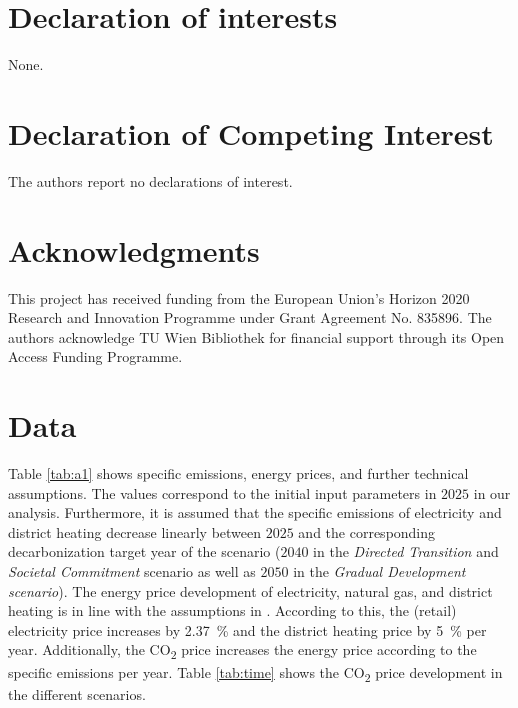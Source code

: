 \documentclass[review]{elsarticle}
\begin{document}






\section*{Declaration of interests}
None.
\section*{Declaration of Competing Interest}
The authors report no declarations of interest.
\section*{Acknowledgments}
This project has received funding from the European Union's Horizon 2020 Research and Innovation Programme under Grant Agreement No. 835896. The authors acknowledge TU Wien Bibliothek for financial support through its Open Access Funding Programme.


\appendix
\setcounter{table}{0}
\setcounter{figure}{0}
\newpage
\section{Data}\label{app:data}
Table \ref{tab:a1} shows specific emissions, energy prices, and further technical assumptions. The values correspond to the initial input parameters in $2025$ in our analysis. Furthermore, it is assumed that the specific emissions of electricity and district heating decrease linearly between $2025$ and the corresponding decarbonization target year of the scenario ($2040$ in the \textit{Directed Transition} and \textit{Societal Commitment} scenario as well as $2050$ in the \textit{Gradual Development scenario}). The energy price development of electricity, natural gas, and district heating is in line with the assumptions in \cite{fina2019profitability}. According to this, the (retail) electricity price increases by \SI{2.37}{\%} and the district heating price by \SI{5}{\%} per year. Additionally, the CO\textsubscript{2} price increases the energy price according to the specific emissions per year. Table \ref{tab:time} shows the CO\textsubscript{2} price development in the different scenarios. 
\end{document}
